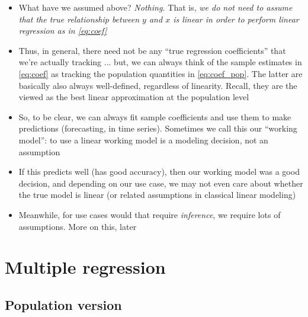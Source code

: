 \documentclass{article}
\begin{document}
\begin{itemize}
\item What have we assumed above? \emph{Nothing.} That is, \emph{we do  
    not need to assume that the true relationship between $y$ and $x$ is linear
    in order to perform linear regression as in \eqref{eq:coef}}

\item Thus, in general, there need not be any ``true regression coefficients'' 
  that we're actually tracking ... but, we can always think of the sample
  estimates  in \eqref{eq:coef} as tracking 
  the population quantities  in
  \eqref{eq:coef_pop}. The latter are basically also always well-defined, 
  regardless of linearity. Recall, they are the viewed as the best linear
  approximation at the population level 

\item So, to be clear, we can always fit sample coefficients  and use them to make predictions (forecasting, in time
  series). Sometimes we call this our ``working model'': to use a linear working
  model is a modeling decision, not an assumption  

\item If this predicts well (has good accuracy), then our working model was a
  good decision, and depending on our use case, we may not even care about
  whether the true model is linear (or related assumptions in classical linear
  modeling) 

\item Meanwhile, for use cases would that require \emph{inference}, we require
  lots of assumptions. More on this, later
\end{itemize}

\section{Multiple regression}

\subsection{Population version}
\end{document}
